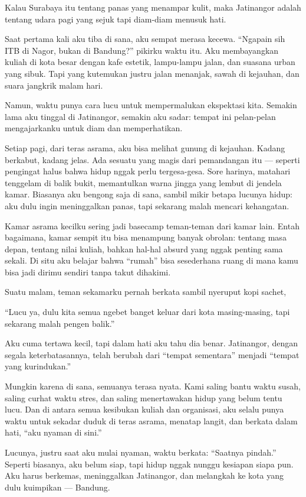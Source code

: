 \documentclass[
  letterpaper,
  DIV=11,
  numbers=noendperiod]{scrreprt}
\begin{document}
Kalau Surabaya itu tentang panas yang menampar kulit, maka Jatinangor
adalah tentang udara pagi yang sejuk tapi diam-diam menusuk hati.

Saat pertama kali aku tiba di sana, aku sempat merasa kecewa. ``Ngapain
sih ITB di Nagor, bukan di Bandung?'' pikirku waktu itu. Aku
membayangkan kuliah di kota besar dengan kafe estetik, lampu-lampu
jalan, dan suasana urban yang sibuk. Tapi yang kutemukan justru jalan
menanjak, sawah di kejauhan, dan suara jangkrik malam hari.

Namun, waktu punya cara lucu untuk mempermalukan ekspektasi kita.
Semakin lama aku tinggal di Jatinangor, semakin aku sadar: tempat ini
pelan-pelan mengajarkanku untuk diam dan memperhatikan.

Setiap pagi, dari teras asrama, aku bisa melihat gunung di kejauhan.
Kadang berkabut, kadang jelas. Ada sesuatu yang magis dari pemandangan
itu --- seperti pengingat halus bahwa hidup nggak perlu tergesa-gesa.
Sore harinya, matahari tenggelam di balik bukit, memantulkan warna
jingga yang lembut di jendela kamar. Biasanya aku bengong saja di sana,
sambil mikir betapa lucunya hidup: aku dulu ingin meninggalkan panas,
tapi sekarang malah mencari kehangatan.

Kamar asrama kecilku sering jadi basecamp teman-teman dari kamar lain.
Entah bagaimana, kamar sempit itu bisa menampung banyak obrolan: tentang
masa depan, tentang nilai kuliah, bahkan hal-hal absurd yang nggak
penting sama sekali. Di situ aku belajar bahwa ``rumah'' bisa
sesederhana ruang di mana kamu bisa jadi dirimu sendiri tanpa takut
dihakimi.

Suatu malam, teman sekamarku pernah berkata sambil nyeruput kopi sachet,

``Lucu ya, dulu kita semua ngebet banget keluar dari kota masing-masing,
tapi sekarang malah pengen balik.''

Aku cuma tertawa kecil, tapi dalam hati aku tahu dia benar. Jatinangor,
dengan segala keterbatasannya, telah berubah dari ``tempat sementara''
menjadi ``tempat yang kurindukan.''

Mungkin karena di sana, semuanya terasa nyata. Kami saling bantu waktu
susah, saling curhat waktu stres, dan saling menertawakan hidup yang
belum tentu lucu. Dan di antara semua kesibukan kuliah dan organisasi,
aku selalu punya waktu untuk sekadar duduk di teras asrama, menatap
langit, dan berkata dalam hati, ``aku nyaman di sini.''

Lucunya, justru saat aku mulai nyaman, waktu berkata: ``Saatnya
pindah.'' Seperti biasanya, aku belum siap, tapi hidup nggak nunggu
kesiapan siapa pun. Aku harus berkemas, meninggalkan Jatinangor, dan
melangkah ke kota yang dulu kuimpikan --- Bandung.
\end{document}
